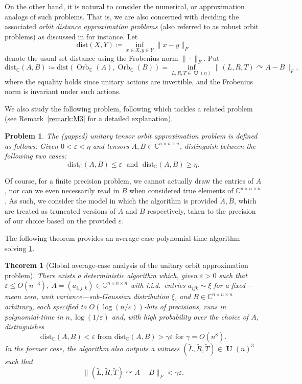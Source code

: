 \documentclass[11pt]{article}
\numberwithin{equation}{section}
\newtheorem{theorem}{Theorem}[section]
\newtheorem{problem}{\bf Problem}
\theoremstyle{remark}
\DeclareMathOperator{\Orb}{Orb}
\DeclareMathOperator{\Unitary}{\textbf{U}}
\newcommand{\C}{\mathbb{C}}
\newcommand{\dist}{\mathrm{dist}}
\newcommand{\CC}{\mathbb{C}}
\begin{document}
On the other hand, it is natural to consider the numerical, or approximation analogs of such problems. That is, we are also concerned with deciding the associated \emph{orbit distance approximation problems} (also referred to as robust orbit problems) as discussed in \cite{burgisser2024complexity} for instance.
Let
\[
\dist(X, Y)\coloneqq \inf_{x \in X, y \in Y} \|x-y\|_F
\]
denote the usual set distance using the Frobenius norm $\|\cdot\|_F$. 
Put
\[
\dist_\C(A,B) \coloneqq \dist(\Orb_\C(A), \Orb_\C(B)) = \inf_{L,R,T\in \Unitary(n)}\|(L,R,T)\curvearrowright A-B\|_F,
\]
where the equality holds since unitary actions are invertible, and the Frobenius norm is invariant under such actions.

We also study the following problem, following \cite[Theorem M3]{AGLOW18} which tackles a related problem (see Remark~\ref{remark:M3} for a detailed explanation).

\begin{problem}\label{prob-2}
The \emph{(gapped) unitary tensor orbit approximation problem} is defined as follows: Given $0<\varepsilon<\eta$ and tensors  $A,B \in \C^{n\times n \times n}$, distinguish between the following two cases: \[
\dist_\CC(A,B) \leq \varepsilon \; \text{ and }\; \dist_\CC(A,B) \geq \eta.
\]
\end{problem}

Of course, for a finite precision problem, we cannot actually draw the entries of $A$, nor can 
we even necessarily read in $B$ when considered true elements of $\C^{n\times n \times n}$. As such, we consider the model in which the algorithm is provided 
$\widetilde{A}, \widetilde{B}$, which are treated as truncated versions of $A$ and $B$ respectively, taken to the precision of our choice based on the provided $\varepsilon$.

The following theorem provides an average-case polynomial-time algorithm solving \cref{prob-2}.

\begin{theorem}[Global average-case analysis of the unitary orbit approximation problem]\label{thm:robustOrbit}
There exists a deterministic algorithm which, given $\varepsilon > 0$ such that $\varepsilon \le O(n^{-3})$, $A=(a_{i,j,k})\in \C^{n\times n\times n}$ with i.i.d.\ entries $a_{ijk} \sim \xi$ for a fixed---mean zero, unit variance---sub-Gaussian distribution $\xi$, and $B\in \C^{n\times n\times n}$ arbitrary, each specified to $O(\log(n/\varepsilon))$-bits of precisions, runs in polynomial-time in $n,\log(1/\varepsilon)$ and, with high probability over the choice of $A$, distinguishes 
$$\dist_\C(A,B)<\varepsilon\text{ from }\dist_\C(A,B)>\gamma\varepsilon\text{ for }\gamma = O(n^8).$$ In the former case, the algorithm also outputs a witness $(\widetilde{L},\widetilde{R},\widetilde{T})\in \Unitary(n)^3$ such that 
$$\|(\widetilde{L},\widetilde{R},\widetilde{T})\curvearrowright A-B\|_F< \gamma\varepsilon.$$
\end{theorem}
\end{document}
